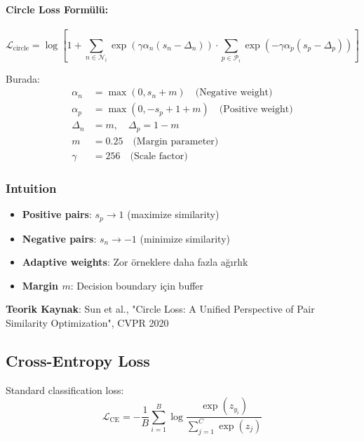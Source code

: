 \documentclass[12pt,a4paper]{article}
\begin{document}
\paragraph{Circle Loss Formülü:}
\begin{equation}
    \mathcal{L}_{\text{circle}} = \log\left[1 + \sum_{n \in \mathcal{N}_i} \exp(\gamma \alpha_n (s_n - \Delta_n)) \cdot \sum_{p \in \mathcal{P}_i} \exp(-\gamma \alpha_p (s_p - \Delta_p))\right]
\end{equation}

Burada:
\begin{align}
    \alpha_n &= \max(0, s_n + m) \quad \text{(Negative weight)} \\
    \alpha_p &= \max(0, -s_p + 1 + m) \quad \text{(Positive weight)} \\
    \Delta_n &= m, \quad \Delta_p = 1 - m \\
    m &= 0.25 \quad \text{(Margin parameter)} \\
    \gamma &= 256 \quad \text{(Scale factor)}
\end{align}

\subsubsection{Intuition}
\begin{itemize}
    \item \textbf{Positive pairs}: $s_p \to 1$ (maximize similarity)
    \item \textbf{Negative pairs}: $s_n \to -1$ (minimize similarity)
    \item \textbf{Adaptive weights}: Zor örneklere daha fazla ağırlık
    \item \textbf{Margin $m$}: Decision boundary için buffer
\end{itemize}

\textbf{Teorik Kaynak}: Sun et al., "Circle Loss: A Unified Perspective of Pair Similarity Optimization", CVPR 2020

\subsection{Cross-Entropy Loss}

Standard classification loss:
\begin{equation}
    \mathcal{L}_{\text{CE}} = -\frac{1}{B}\sum_{i=1}^{B} \log\frac{\exp(z_{y_i})}{\sum_{j=1}^{C} \exp(z_j)}
\end{equation}
\end{document}
